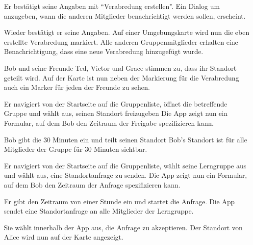 \documentclass[parskip=full,11pt]{scrartcl}
\begin{document}
{Er bestätigt seine Angaben mit \enquote{Verabredung erstellen}.}
{Ein Dialog um anzugeben, wann die anderen Mitglieder benachrichtigt werden sollen, erscheint.}

{Wieder bestätigt er seine Angaben.}
{Auf einer Umgebungskarte wird nun die eben erstellte Verabredung markiert.
Alle anderen Gruppenmitglieder erhalten eine Benachrichtigung,
dass eine neue Verabredung hinzugefügt wurde.}

{Bob und seine Freunde Ted, Victor und Grace stimmen zu, dass ihr Standort geteilt wird.}
{Auf der Karte ist nun neben der Markierung für die Verabredung auch ein Marker für
jeden der Freunde zu sehen.}


{Er navigiert von der Startseite auf die Gruppenliste, öffnet die betreffende Gruppe und wählt aus, seinen Standort freizugeben}
{Die App zeigt nun ein Formular, auf dem Bob den Zeitraum der Freigabe spezifizieren kann.}

\testStep{}
{Bob gibt die 30 Minuten ein und teilt seinen Standort}
{Bob's Standort ist für alle Mitglieder der Gruppe für 30 Minuten sichtbar.}


{Er navigiert von der Startseite auf die Gruppenliste, wählt seine Lerngruppe aus und wählt aus, eine Standortanfrage zu senden.}
{Die App zeigt nun ein Formular, auf dem Bob den Zeitraum der Anfrage spezifizieren kann.}

{Er gibt den Zeitraum von einer Stunde ein und startet die Anfrage.}
{Die App sendet eine Standortanfrage an alle Mitglieder der Lerngruppe.}

{Sie wählt innerhalb der App aus, die Anfrage zu akzeptieren.}
{Der Standort von Alice wird nun auf der Karte angezeigt.}
\end{document}
